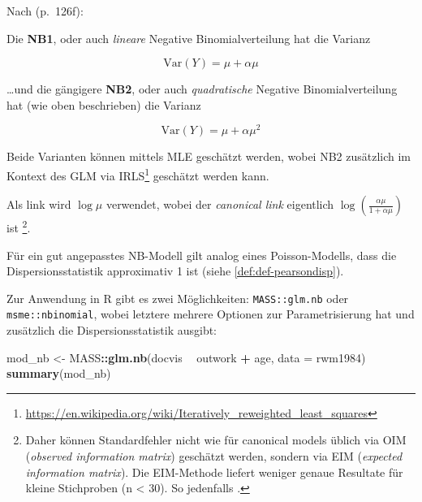 \documentclass[ngerman,a4paper,]{scrartcl}
\newenvironment{Shaded}{\begin{snugshade}}{\end{snugshade}}
\newcommand{\DataTypeTok}[1]{\textcolor[rgb]{0.13,0.29,0.53}{#1}}
\newcommand{\KeywordTok}[1]{\textcolor[rgb]{0.13,0.29,0.53}{\textbf{#1}}}
\newcommand{\NormalTok}[1]{#1}
\newcommand{\OperatorTok}[1]{\textcolor[rgb]{0.81,0.36,0.00}{\textbf{#1}}}
\newcommand{\StringTok}[1]{\textcolor[rgb]{0.31,0.60,0.02}{#1}}
\DeclareRobustCommand{\href}[2]{#2\footnote{\url{#1}}}
\theoremstyle{definition}
\theoremstyle{definition}
\theoremstyle{definition}
\theoremstyle{remark}
\let\BeginKnitrBlock\begin \let\EndKnitrBlock\end
\begin{document}
\BeginKnitrBlock{definition}[NB1 und NB2]
\protect\hypertarget{def:defNB1NB2}{}{\label{def:defNB1NB2} \iffalse (NB1 und NB2) \fi{} }Nach \citet{hilbeModelingCountData2014} (p.~126f):

Die \textbf{NB1}, oder auch \emph{lineare} Negative Binomialverteilung hat die Varianz

\begin{equation*}
\mathrm{Var}(Y) = \mu + \alpha \mu
\end{equation*}

\ldots{}und die gängigere \textbf{NB2}, oder auch \emph{quadratische} Negative Binomialverteilung hat (wie oben beschrieben) die Varianz

\begin{equation*}
\mathrm{Var}(Y) = \mu + \alpha \mu^2
\end{equation*}
\EndKnitrBlock{definition}

Beide Varianten können mittels MLE geschätzt werden, wobei NB2 zusätzlich im Kontext des GLM via \href{https://en.wikipedia.org/wiki/Iteratively_reweighted_least_squares}{IRLS} geschätzt werden kann.

Als link wird \(\log \mu\) verwendet, wobei der \emph{canonical link} eigentlich \(\log\left(\frac{\alpha\mu}{1 + \alpha\mu}\right)\) ist \footnote{Daher können Standardfehler nicht wie für canonical models üblich via OIM (\emph{observed information matrix}) geschätzt werden, sondern via EIM (\emph{expected information matrix}). Die EIM-Methode liefert weniger genaue Resultate für kleine Stichproben (n \textless{} 30). So jedenfalls \citet{hilbeModelingCountData2014}.}.

Für ein gut angepasstes NB-Modell gilt analog eines Poisson-Modells, dass die Dispersionsstatistik approximativ 1 ist (siehe \ref{def:def-pearsondisp}).

Zur Anwendung in R gibt es zwei Möglichkeiten: \texttt{MASS::glm.nb} oder \texttt{msme::nbinomial}, wobei letztere mehrere Optionen zur Parametrisierung hat und zusätzlich die Dispersionsstatistik ausgibt:

\begin{Shaded}
\begin{Highlighting}[]
\NormalTok{mod_nb <-}\StringTok{ }\NormalTok{MASS}\OperatorTok{::}\KeywordTok{glm.nb}\NormalTok{(docvis }\OperatorTok{~}\StringTok{ }\NormalTok{outwork }\OperatorTok{+}\StringTok{ }\NormalTok{age,}
                       \DataTypeTok{data =}\NormalTok{ rwm1984)}
\KeywordTok{summary}\NormalTok{(mod_nb)}
\end{Highlighting}
\end{Shaded}
\end{document}
